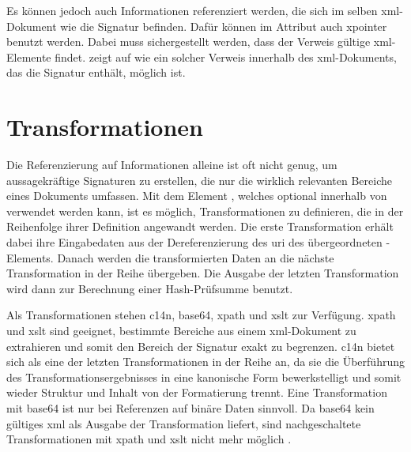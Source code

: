 

Es können jedoch auch Informationen referenziert werden, die sich im selben \gls{xml}-Dokument wie die Signatur befinden. Dafür können im Attribut
 auch \gls{xpointer} benutzt werden. Dabei muss sichergestellt werden, dass der Verweis gültige \gls{xml}-Elemente findet.
 zeigt auf  wie ein solcher Verweis innerhalb des \gls{xml}-Dokuments,
das die Signatur enthält, möglich ist.\todo

\section{Transformationen}
\label{sec:XML-DSig:Transformationen}
Die Referenzierung auf Informationen alleine ist oft nicht genug, um aussagekräftige Signaturen zu erstellen, die nur die wirklich relevanten Bereiche eines
Dokuments umfassen. Mit dem Element , welches optional innerhalb von  verwendet werden kann, ist es möglich,
Transformationen zu definieren, die in der Reihenfolge ihrer Definition angewandt werden. Die erste Transformation erhält dabei ihre Eingabedaten aus der
Dereferenzierung des \gls{uri} des übergeordneten -Elements. Danach werden die transformierten Daten an die nächste Transformation in der
Reihe übergeben. Die Ausgabe der letzten Transformation wird dann zur Berechnung einer Hash-Prüfsumme benutzt.

Als Transformationen stehen \gls{c14n}, \gls{base64}, \gls{xpath} und \gls{xslt} zur Verfügung. \gls{xpath} und \gls{xslt} sind geeignet, bestimmte Bereiche aus
einem \gls{xml}-Dokument zu extrahieren und somit den Bereich der Signatur exakt zu begrenzen. \gls{c14n} bietet sich als eine der letzten
Transformationen in der Reihe an, da sie die Überführung des Transformationsergebnisses in eine kanonische Form bewerkstelligt und somit wieder Struktur und
Inhalt von der Formatierung trennt. Eine Transformation mit \gls{base64} ist nur bei Referenzen auf binäre Daten sinnvoll. Da \gls{base64} kein gültiges
\gls{xml} als Ausgabe der Transformation liefert, sind nachgeschaltete Transformationen mit \gls{xpath} und \gls{xslt} nicht mehr möglich \cite{xml-dsig:w3c}.

